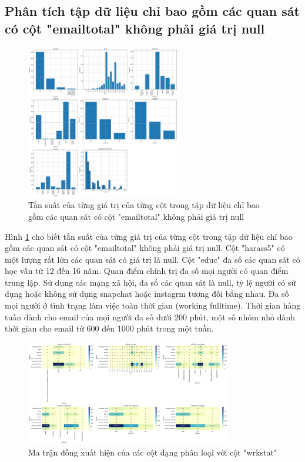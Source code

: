 \subsection{Phân tích tập dữ liệu chỉ bao gồm các quan sát có cột "emailtotal" không phải giá trị null}

\begin{figure}[H]
    \centering
    \includegraphics[width=0.6\textwidth]{figures/Thanh/Data_Analysis/Non_null_frequency_of_unique_values_of_columns.png}
    \caption{Tần suất của từng giá trị của từng cột trong tập dữ liệu chỉ bao gồm các quan sát có cột "emailtotal" không phải giá trị null}
    \label{fig:Non_null_frequency_of_unique_values_of_columns}
\end{figure}

Hình \ref{fig:Non_null_frequency_of_unique_values_of_columns} cho biết tần suất của từng giá trị của từng cột trong tập dữ liệu chỉ bao gồm các quan sát có cột "emailtotal" không phải giá trị null.
Cột "harass5" có một lượng rất lớn các quan sát có giá trị là null.
Cột "educ" đa số các quan sát có học vấn từ 12 đến 16 năm.
Quan điểm chính trị đa số mọi người có quan điểm trung lập.
Sử dụng các mạng xã hội, đa số các quan sát là null, tỷ lệ người có sử dụng hoặc không sử dụng snapchat hoặc instagrm tương đối bằng nhau.
Đa số mọi người ở tình trạng làm việc toàn thời gian (working fulltime).
Thời gian hàng tuần dành cho email của mọi người đa số dưới 200 phút, một số nhóm nhỏ dành thời gian cho email từ 600 đến 1000 phút trong một tuần.

\begin{figure}[H]
    \centering
    \includegraphics[width=0.8\textwidth]{figures/Thanh/Data_Analysis/Non_null_cooccurrence_matrix_categorical_columns_vs_wrkstat.png}
    \caption{Ma trận đồng xuất hiện của các cột dạng phân loại với cột "wrkstat"}
    \label{fig:Non_null_cooccurrence_matrix_categorical_columns_vs_wrkstat}
\end{figure}

